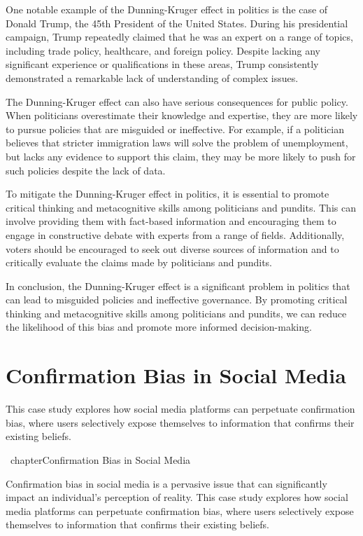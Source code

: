 \documentclass{report}%
\begin{document}
{{{{{{{{{{{{{{One notable example of the Dunning-Kruger effect in politics is the case of Donald Trump, the 45th President of the United States. During his presidential campaign, Trump repeatedly claimed that he was an expert on a range of topics, including trade policy, healthcare, and foreign policy. Despite lacking any significant experience or qualifications in these areas, Trump consistently demonstrated a remarkable lack of understanding of complex issues.

The Dunning-Kruger effect can also have serious consequences for public policy. When politicians overestimate their knowledge and expertise, they are more likely to pursue policies that are misguided or ineffective. For example, if a politician believes that stricter immigration laws will solve the problem of unemployment, but lacks any evidence to support this claim, they may be more likely to push for such policies despite the lack of data.

To mitigate the Dunning-Kruger effect in politics, it is essential to promote critical thinking and metacognitive skills among politicians and pundits. This can involve providing them with fact-based information and encouraging them to engage in constructive debate with experts from a range of fields. Additionally, voters should be encouraged to seek out diverse sources of information and to critically evaluate the claims made by politicians and pundits.

In conclusion, the Dunning-Kruger effect is a significant problem in politics that can lead to misguided policies and ineffective governance. By promoting critical thinking and metacognitive skills among politicians and pundits, we can reduce the likelihood of this bias and promote more informed decision-making.%
\section{Confirmation Bias in Social Media}%
This case study explores how social media platforms can perpetuate confirmation bias, where users selectively expose themselves to information that confirms their existing beliefs.

%
\ chapter{Confirmation Bias in Social Media}

 Confirmation bias in social media is a pervasive issue that can significantly impact an individual's perception of reality. This case study explores how social media platforms can perpetuate confirmation bias, where users selectively expose themselves to information that confirms their existing beliefs.

}}}}}}}}}}}}}}
\end{document}
